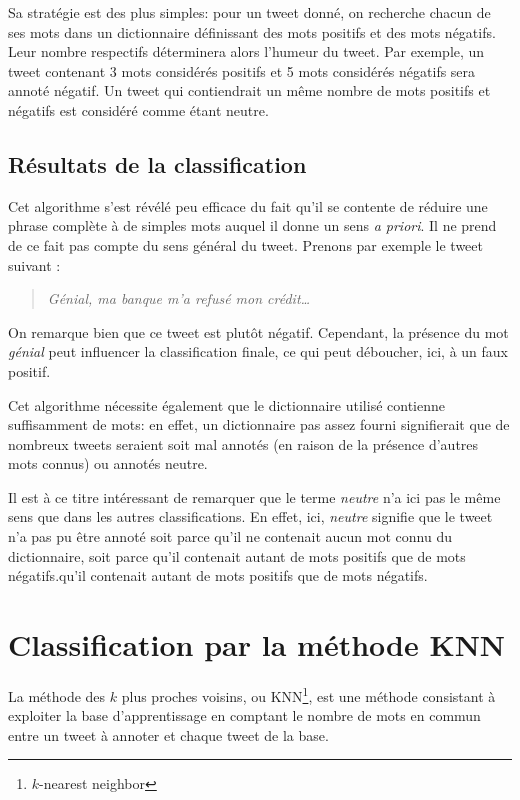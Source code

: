 \documentclass[12pt,a4paper]{report}
\begin{document}
Sa stratégie est des plus simples: pour un tweet donné, on recherche
chacun de ses mots dans un dictionnaire définissant des mots positifs et des
mots négatifs. Leur nombre respectifs déterminera alors l'humeur du tweet. Par
exemple, un tweet contenant 3 mots considérés positifs et 5 mots considérés
négatifs sera annoté négatif. Un tweet qui contiendrait un même nombre de mots
positifs et négatifs est considéré comme étant neutre.

\subsection{Résultats de la classification}
Cet algorithme s'est révélé peu efficace du fait qu'il se contente de réduire
une phrase complète à de simples mots auquel il donne un sens \textit{a priori}.
Il ne prend de ce fait pas compte du sens général du tweet. Prenons par exemple
le tweet suivant :

\begin{quote}
    \textit{Génial, ma banque m'a refusé mon crédit…}
\end{quote}

On remarque bien que ce tweet est plutôt négatif. Cependant, la présence du mot
\textit{génial} peut influencer la classification finale, ce qui peut déboucher,
ici, à un faux positif.

Cet algorithme nécessite également que le dictionnaire utilisé contienne
suffisamment de mots: en effet, un dictionnaire pas assez fourni signifierait
que de nombreux tweets seraient soit mal annotés (en raison de la présence
d'autres mots connus) ou annotés neutre.

Il est à ce titre intéressant de remarquer que le terme \textit{neutre} n'a ici
pas le même sens que dans les autres classifications. En effet, ici,
\textit{neutre} signifie que le tweet n'a pas pu être annoté soit parce qu'il ne
contenait aucun mot connu du dictionnaire, soit parce qu'il contenait autant de
mots positifs que de mots négatifs.qu'il contenait autant de mots positifs que
de mots négatifs.

\newpage
\section{Classification par la méthode KNN}
La méthode des $k$ plus proches voisins, ou KNN\footnote{$k$-nearest neighbor},
est une méthode consistant à exploiter la base d'apprentissage en comptant le
nombre de mots en commun entre un tweet à annoter et chaque tweet de la base.
\end{document}
